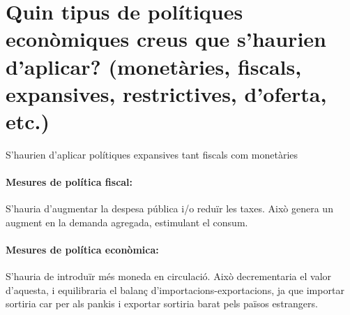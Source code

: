 \section{Quin tipus de polítiques econòmiques creus que s’haurien d’aplicar?
(monetàries, fiscals, expansives, restrictives, d’oferta, etc.)}

S'haurien d'aplicar polítiques expansives tant fiscals com monetàries 
\cite{types_of_economic_policy}


\paragraph{Mesures de política fiscal:}
S'hauria d'augmentar la despesa pública i/o reduïr les taxes.
Això genera un augment en la demanda agregada, estimulant el consum.


\paragraph{Mesures de política econòmica:}
S'hauria de introduïr més moneda en circulació. Això decrementaria el valor
d'aquesta, i equilibraria el balanç d'importacions-exportacions, ja que
importar sortiria car per als pankis i exportar sortiria barat pels països
estrangers.


